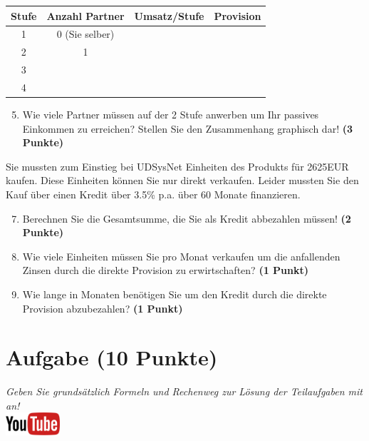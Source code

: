 \documentclass[a4paper, 9pt]{scrartcl}\usepackage[]{graphicx}\usepackage[]{xcolor}
\begin{document}
\begin{center}
\begin{tabular}{c|c|c|c}
  \toprule
  \textbf{Stufe} & \textbf{Anzahl Partner}  & \textbf{Umsatz/Stufe} & \textbf{Provision}\\
  \midrule
  1 & 0 (Sie selber)  &  & \\ \midrule
  2 & 1  &  &  \\ \midrule
  3 &   &  &  \\ \midrule
  4 &   &  &  \\
  \bottomrule
\end{tabular}
\end{center}

\begin{enumerate}
  \setcounter{enumi}{4}
\item Wie viele Partner m{\"u}ssen auf der 2 Stufe anwerben um Ihr passives
  Einkommen zu erreichen? Stellen Sie den Zusammenhang graphisch dar! \textbf{(3 Punkte)}
\end{enumerate}

Sie mussten zum Einstieg bei UDSysNet Einheiten des Produkts
f{\"u}r 2625EUR kaufen. Diese Einheiten k{\"o}nnen Sie nur direkt
verkaufen. Leider mussten Sie den Kauf {\"u}ber einen Kredit {\"u}ber
3.5\% p.a. {\"u}ber 60 Monate finanzieren.

\begin{enumerate}
  \setcounter{enumi}{6}
\item Berechnen Sie die Gesamtsumme, die Sie als Kredit abbezahlen m{\"u}ssen! \textbf{(2 Punkte)}
\item Wie viele Einheiten m{\"u}ssen Sie pro Monat verkaufen um die anfallenden Zinsen
  durch die direkte Provision zu erwirtschaften? \textbf{(1 Punkt)}
\item Wie lange in
  Monaten ben{\"o}tigen Sie um den Kredit durch die direkte
  Provision abzubezahlen? \textbf{(1 Punkt)}
\end{enumerate} 
\clearpage

\section{Aufgabe \hfill (10 Punkte)}

\textit{Geben Sie grunds{\"a}tzlich Formeln und Rechenweg zur L{\"o}sung der
  Teilaufgaben mit an!} \\[1Ex]

\hfill\href{https://youtu.be/paXxVmyfDPs}{\includegraphics[width =
  2cm]{img/youtube}} %
\hspace{2Ex}
\end{document}
